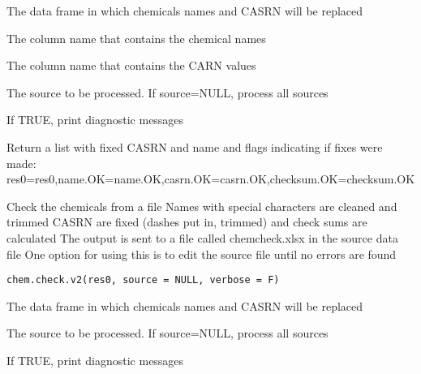 \documentclass[letterpaper]{book}
\begin{document}
%
\begin{Arguments}
\begin{ldescription}
\item[\code{res0}] The data frame in which chemicals names and CASRN will be replaced

\item[\code{name.col}] The column name that contains the chemical names

\item[\code{casrn.col}] The column name that contains the CARN values

\item[\code{source}] The source to be processed. If source=NULL, process all sources

\item[\code{verbose}] If TRUE, print diagnostic messages
\end{ldescription}
\end{Arguments}
%
\begin{Value}
Return a list with fixed CASRN and name and flags indicating if fixes were made:
res0=res0,name.OK=name.OK,casrn.OK=casrn.OK,checksum.OK=checksum.OK
\end{Value}
%
\begin{Description}\relax
Check the chemicals from a file
Names with special characters are cleaned and trimmed
CASRN are fixed (dashes put in, trimmed) and check sums are calculated
The output is sent to a file called chemcheck.xlsx in the source data file
One option for using this is to edit the source file until no errors are found
\end{Description}
%
\begin{Usage}
\begin{verbatim}
chem.check.v2(res0, source = NULL, verbose = F)
\end{verbatim}
\end{Usage}
%
\begin{Arguments}
\begin{ldescription}
\item[\code{res0}] The data frame in which chemicals names and CASRN will be replaced

\item[\code{source}] The source to be processed. If source=NULL, process all sources

\item[\code{verbose}] If TRUE, print diagnostic messages
\end{ldescription}
\end{Arguments}
\end{document}
